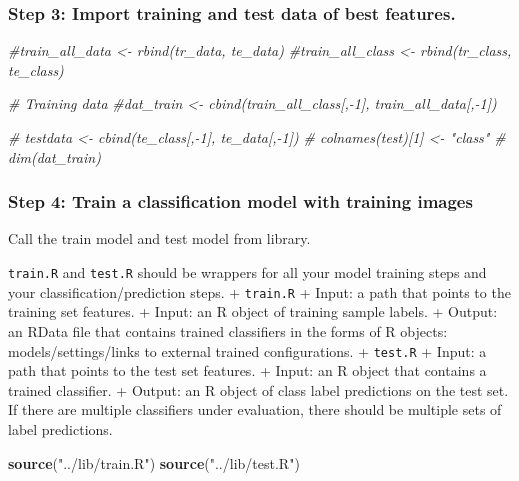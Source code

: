 \documentclass[]{article}
\newenvironment{Shaded}{\begin{snugshade}}{\end{snugshade}}
\newcommand{\KeywordTok}[1]{\textcolor[rgb]{0.13,0.29,0.53}{\textbf{#1}}}
\newcommand{\StringTok}[1]{\textcolor[rgb]{0.31,0.60,0.02}{#1}}
\newcommand{\CommentTok}[1]{\textcolor[rgb]{0.56,0.35,0.01}{\textit{#1}}}
\newcommand{\NormalTok}[1]{#1}
\begin{document}
\subsubsection{Step 3: Import training and test data of best
features.}\label{step-3-import-training-and-test-data-of-best-features.}

\begin{Shaded}
\begin{Highlighting}[]
\CommentTok{#train_all_data <- rbind(tr_data, te_data)}
\CommentTok{#train_all_class <- rbind(tr_class, te_class)}

\CommentTok{# Training data}
\CommentTok{#dat_train <- cbind(train_all_class[,-1], train_all_data[,-1])}


\CommentTok{# testdata <- cbind(te_class[,-1], te_data[,-1])}
\CommentTok{# colnames(test)[1] <- "class"}
\CommentTok{# dim(dat_train)}
\end{Highlighting}
\end{Shaded}

\subsubsection{Step 4: Train a classification model with training
images}\label{step-4-train-a-classification-model-with-training-images}

Call the train model and test model from library.

\texttt{train.R} and \texttt{test.R} should be wrappers for all your
model training steps and your classification/prediction steps. +
\texttt{train.R} + Input: a path that points to the training set
features. + Input: an R object of training sample labels. + Output: an
RData file that contains trained classifiers in the forms of R objects:
models/settings/links to external trained configurations. +
\texttt{test.R} + Input: a path that points to the test set features. +
Input: an R object that contains a trained classifier. + Output: an R
object of class label predictions on the test set. If there are multiple
classifiers under evaluation, there should be multiple sets of label
predictions.

\begin{Shaded}
\begin{Highlighting}[]
\KeywordTok{source}\NormalTok{(}\StringTok{"../lib/train.R"}\NormalTok{)}
\KeywordTok{source}\NormalTok{(}\StringTok{"../lib/test.R"}\NormalTok{)}
\end{Highlighting}
\end{Shaded}
\end{document}

